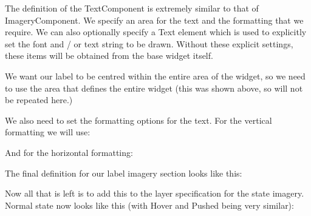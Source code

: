 The definition of the Text\+Component is extremely similar to that of Imagery\+Component. We specify an area for the text and the formatting that we require. We can also optionally specify a Text element which is used to explicitly set the font and / or text string to be drawn. Without these explicit settings, these items will be obtained from the base widget itself.

We want our label to be centred within the entire area of the widget, so we need to use the area that defines the entire widget (this was shown above, so will not be repeated here.)

We also need to set the formatting options for the text. For the vertical formatting we will use\+: 
\begin{DoxyCode}{0}
\end{DoxyCode}


And for the horizontal formatting\+: 
\begin{DoxyCode}{0}
\end{DoxyCode}


The final definition for our label imagery section looks like this\+: 
\begin{DoxyCode}{0}
\end{DoxyCode}


Now all that is left is to add this to the layer specification for the state imagery. Normal state now looks like this (with Hover and Pushed being very similar)\+: 
\begin{DoxyCode}{0}
\end{DoxyCode}


